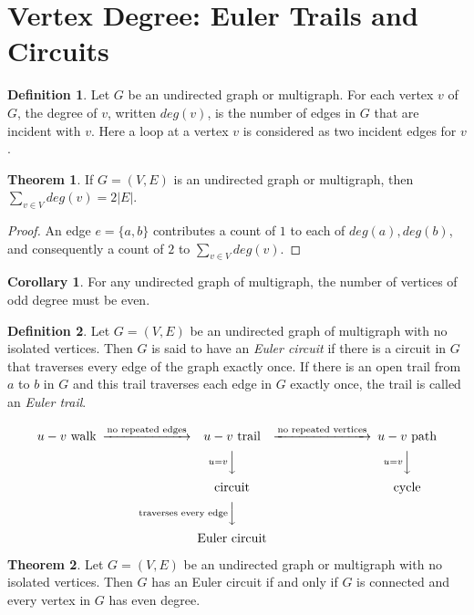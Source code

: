 \documentclass[letter]{book}
\theoremstyle{definition}
\newtheorem{theorem}{Theorem}[chapter]
\newtheorem{corollary}{Corollary}[chapter]
\theoremstyle{definition}
\newtheorem{mydef}{Definition}[chapter]
\theoremstyle{remark}
\begin{document}
\section{Vertex Degree: Euler Trails and Circuits}
\begin{mydef}
    Let $G$ be an undirected graph or multigraph. For each vertex $v$ of $G$, the degree of $v$, written $deg(v)$, is the number of edges in $G$ that are incident with $v$. Here a loop at a vertex $v$ is considered as two incident edges for $v$.
\end{mydef}
\bigskip
\begin{theorem}
    If $G=(V,E)$ is an undirected graph or multigraph, then $\sum_{v\in V}{deg(v)}=2|E|$.
    \begin{proof} An edge $e=\{a,b\}$ contributes a count of $1$ to each of $deg(a),deg(b)$, and consequently a count of $2$ to $\sum_{v\in V}{deg(v)}$.
    \end{proof}
\end{theorem}
\bigskip
\begin{corollary}
For any undirected graph of multigraph, the number of vertices of odd degree must be even.
\end{corollary}
\bigskip
\begin{mydef}
    Let $G=(V,E)$ be an undirected graph of multigraph with no isolated vertices. Then $G$ is said to have an \textit{Euler circuit} if there is a circuit in $G$ that traverses every edge of the graph exactly once. If there is an open trail from $a$ to $b$ in $G$  and this trail traverses each edge in $G$ exactly once, the trail is called an \textit{Euler trail}.
\end{mydef}
\begin{equation*}
    \begin{CD}
    u-v\text{ walk} @>\text{no repeated edges}>> u-v\text{ trail} @>{\text{no repeated vertices}}>> u-v\text{ path} \\
    @. @Vu=vVV @Vu=vVV \\
    @. \text{circuit} @. \text{cycle}\\
    @. @V\text{traverses every edge}VV @. \\
    @. \text{Euler circuit} @.
    \end{CD}
\end{equation*}
\bigskip
\begin{theorem}
    Let $G=(V,E)$ be an undirected graph or multigraph with no isolated vertices. Then $G$ has an Euler circuit if and only if $G$ is connected and every vertex in $G$ has even degree.
\end{theorem}
\end{document}
